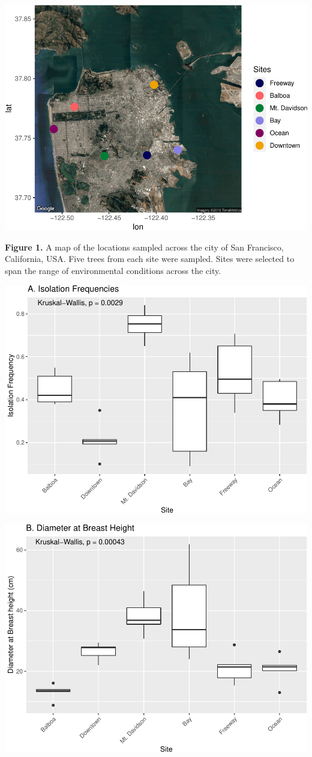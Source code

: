 \documentclass[fleqn,10pt,lineno]{wlpeerj} %
\begin{document}
\includegraphics{gibson2021_files/figure-latex/map-1.pdf}

\textbf{Figure 1.} A map of the locations sampled across the city of San
Francisco, California, USA. Five trees from each site were sampled.
Sites were selected to span the range of environmental conditions across
the city.

\includegraphics{gibson2021_files/figure-latex/isolation-1.pdf}

\includegraphics{gibson2021_files/figure-latex/dbh-1.pdf}
\end{document}
